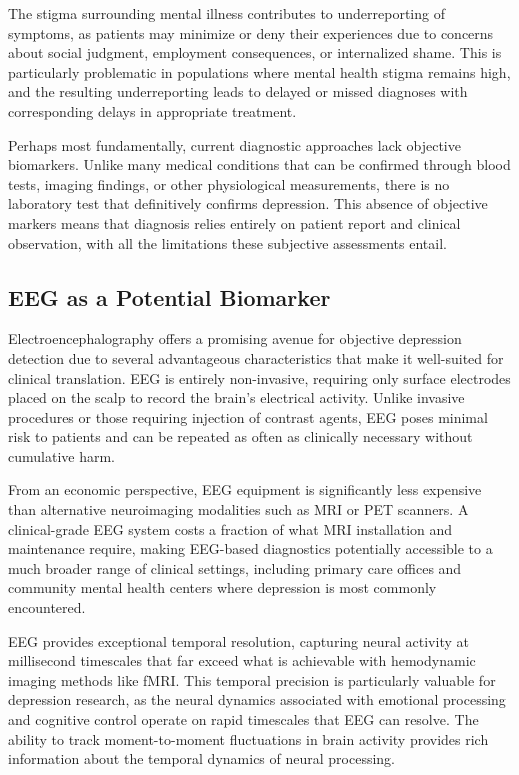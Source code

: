 The stigma surrounding mental illness contributes to underreporting of symptoms, as patients may minimize or deny their experiences due to concerns about social judgment, employment consequences, or internalized shame. This is particularly problematic in populations where mental health stigma remains high, and the resulting underreporting leads to delayed or missed diagnoses with corresponding delays in appropriate treatment.

Perhaps most fundamentally, current diagnostic approaches lack objective biomarkers. Unlike many medical conditions that can be confirmed through blood tests, imaging findings, or other physiological measurements, there is no laboratory test that definitively confirms depression. This absence of objective markers means that diagnosis relies entirely on patient report and clinical observation, with all the limitations these subjective assessments entail.

\subsection{EEG as a Potential Biomarker}

Electroencephalography offers a promising avenue for objective depression detection due to several advantageous characteristics that make it well-suited for clinical translation. EEG is entirely non-invasive, requiring only surface electrodes placed on the scalp to record the brain's electrical activity. Unlike invasive procedures or those requiring injection of contrast agents, EEG poses minimal risk to patients and can be repeated as often as clinically necessary without cumulative harm.

From an economic perspective, EEG equipment is significantly less expensive than alternative neuroimaging modalities such as MRI or PET scanners. A clinical-grade EEG system costs a fraction of what MRI installation and maintenance require, making EEG-based diagnostics potentially accessible to a much broader range of clinical settings, including primary care offices and community mental health centers where depression is most commonly encountered.

EEG provides exceptional temporal resolution, capturing neural activity at millisecond timescales that far exceed what is achievable with hemodynamic imaging methods like fMRI. This temporal precision is particularly valuable for depression research, as the neural dynamics associated with emotional processing and cognitive control operate on rapid timescales that EEG can resolve. The ability to track moment-to-moment fluctuations in brain activity provides rich information about the temporal dynamics of neural processing.

